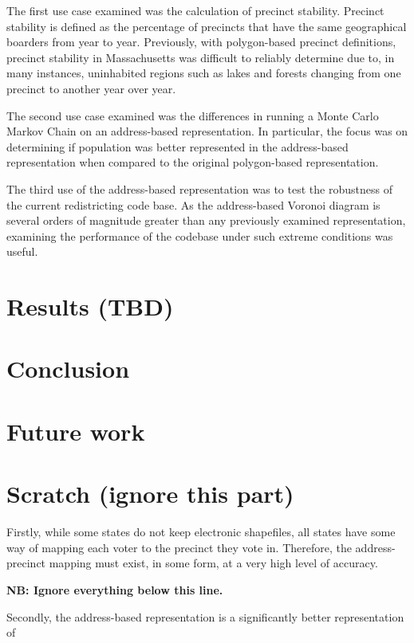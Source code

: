 \documentclass[11pt]{article}
\begin{document}
The first use case examined was the calculation of precinct stability. Precinct stability is defined as the percentage of precincts that have the same geographical boarders from year to year. Previously, with polygon-based precinct definitions, precinct stability in Massachusetts was difficult to reliably determine due to, in many instances, uninhabited regions such as lakes and forests changing from one precinct to another year over year. 

The second use case examined was the differences in running a Monte Carlo Markov Chain on an address-based representation. In particular, the focus was on determining if population was better represented in the address-based representation when compared to the original polygon-based representation.

The third use of the address-based representation was to test the robustness of the current redistricting code base. As the address-based Voronoi diagram is several orders of magnitude greater than any previously examined representation, examining the performance of the codebase under such extreme conditions was useful.
\section{Results (TBD)}
\label{sec:orge5a6566}

\section{Conclusion}
\label{sec:orgf450372}

\section{Future work}
\label{sec:orgd0d265b}

\section{Scratch (ignore this part)}
\label{sec:org72c5fdb}
Firstly, while some states do not keep electronic shapefiles, all states have some way of mapping each voter to the precinct they vote in.
Therefore, the address-precinct mapping must exist, in some form, at a very high level of accuracy.

\textbf{\textbf{NB: Ignore everything below this line.}}

Secondly, the address-based representation is a significantly better representation of
\end{document}
